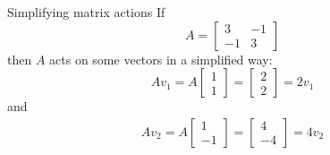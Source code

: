 \documentclass{beamer}
\begin{document}
\begin{frame}{Simplifying matrix actions}
	If
	\begin{equation*}
		A = \left[\begin{matrix}
			3 & -1\\
			-1 & 3
		\end{matrix}\right]
	\end{equation*}
	then $A$ acts on some vectors in a simplified way:
	\begin{equation*}
		A v_1 = 
		A \left[
		\begin{matrix}
		1\\
		1
		\end{matrix}
		\right] = \left[
		\begin{matrix}
		2\\
		2
		\end{matrix}
		\right] = 2v_1
	\end{equation*}
	and
	\begin{equation*}
	\begin{matrix}
	Av_2 =
	A \left[
	\begin{matrix}
	1\\
	-1
	\end{matrix}
	\right] = 
	\left[
	\begin{matrix}
	4\\
	-4
	\end{matrix}
	\right] = 
	4v_2
	\end{matrix}
	\end{equation*}
\end{frame}
\end{document}
